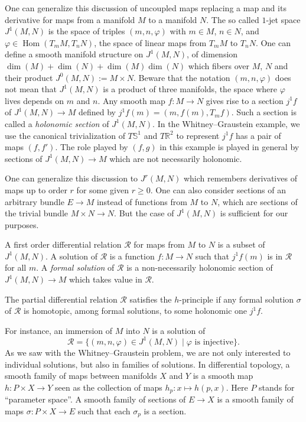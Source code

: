 \documentclass[10pt,a4paper]{article}
\newcommand{\co}{\!:}
\newcommand{\Rel}{\mathcal{R}} %
\DeclareMathOperator{\Hom}{Hom}
\begin{document}
One can generalize this discussion of uncoupled maps replacing a
map and its derivative for maps from a manifold $M$
to a manifold $N$. The so called $1$-jet space $J^1(M, N)$ is the
space of triples $(m, n, φ)$ with $m ∈ M$, $n ∈ N$, and
$φ ∈ \Hom(T_mM, T_nN)$, the space of linear maps from $T_mM$ to $T_nN$.
One can define a smooth manifold structure on $J^1(M, N)$, of dimension
$\dim(M) + \dim(N) + \dim(M)\dim(N)$ which fibers over $M$, $N$ and
their product $J^0(M, N) := M × N$. Beware that the notation $(m, n, φ)$
does not mean that $J^1(M, N)$ is a product of three manifolds, the space
where $φ$ lives depends on $m$ and $n$.
Any smooth map $f \co M → N$ gives rise to a section $j^1f$ of
$J^1(M, N) → M$ defined by $j^1f(m) = (m, f(m), T_m f)$. Such a section is
called a \emph{holonomic section} of $J^1(M, N)$.
In the Whitney--Graustein example, we use the canonical trivialization of
$T𝕊^1$ and $Tℝ^2$ to represent $j^1f$ has a pair of maps $(f, f')$. The
role played by $(f, g)$ in this example is played in general by sections
of $J^1(M, N) → M$ which are not necessarily holonomic.

One can generalize this discussion to $J^r(M, N)$ which remembers
derivatives of maps up to order $r$ for some given $r ≥ 0$. One can also
consider sections of an arbitrary bundle $E → M$ instead of functions
from $M$ to $N$, which are sections of the trivial bundle $M × N → N$.
But the case of $J^1(M, N)$ is sufficient for our purposes.

\begin{definition-intro}
  A first order differential relation $\Rel$ for maps from $M$ to
  $N$ is a subset of $J^1(M, N)$. A solution of $\Rel$ is a function
  $f \co M \to N$ such that $j^1f(m)$ is in $\Rel$ for all $m$.
  A \emph{formal solution} of $\Rel$ is a non-necessarily holonomic
  section of $J^1(M, N) → M$ which takes value in $\Rel$.

  The partial differential relation $\Rel$ satisfies the $h$-principle
  if any formal solution $σ$ of $\Rel$ is homotopic, among formal
  solutions, to some holonomic one $j^1f$.
\end{definition-intro}

For instance, an immersion of $M$ into $N$ is a solution of
\[
\Rel = \{(m, n, φ) ∈ J^1(M, N) \;|\; φ \text{ is injective}\}.
\]
As we saw with
the Whitney--Graustein problem, we are not only interested to individual
solutions, but also in families of solutions. In differential
topology, a smooth family of maps between manifolds $X$ and $Y$ is a smooth map
$h \co P × X → Y$ seen as the collection of maps $h_p \co x ↦ h(p, x)$. Here $P$
stands for ``parameter space''. A smooth family of sections of $E → X$ is a
smooth family of maps $σ \co P × X → E$ such that each $σ_p$ is a section.
\end{document}
